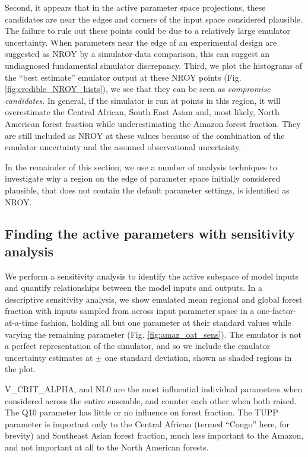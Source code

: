 \documentclass[esd, manuscript]{copernicus}
\begin{document}
Second, it appears that in the active parameter space projections, these candidates are near the edges and corners of the input space considered plausible. The failure to rule out these points could be due to a relatively large emulator uncertainty. When parameters near the edge of an experimental design are suggested as NROY by a simulator-data comparison, this can suggest an undiagnosed fundamental simulator discrepancy. Third, we plot the histograms of the ``best estimate'' emulator output at these NROY points (Fig.  \ref{fig:credible_NROY_hists}), we see that they can be seen as \emph{compromise candidates}. In general, if the simulator is run at points in this region, it will overestimate the Central African, South East Asian and, most likely, North American forest fraction while underestimating the Amazon forest fraction. They are still included as NROY at these values because of the combination of the emulator uncertainty and the assumed observational uncertainty.


In the remainder of this section, we use a number of analysis techniques to investigate why a region on the edge of parameter space initially considered plausible, that does not contain the default parameter settings, is identified as NROY.

\subsection{Finding the active parameters with sensitivity analysis}\label{ssec:sensitivity}

We perform a sensitivity analysis to identify the active subspace of model inputs and quantify relationships between the model inputs and outputs. In a descriptive sensitivity analysis, we show emulated mean regional and global forest fraction with inputs sampled from across input parameter space in a one-factor-at-a-time fashion, holding all but one parameter at their standard values while varying the remaining parameter (Fig.  \ref{fig:amaz_oat_sens}). The emulator is not a perfect representation of the simulator, and so we include the emulator uncertainty estimates at $\pm$ one standard deviation, shown as shaded regions in the plot.

V\_CRIT\_ALPHA, and NL0 are the most influential individual parameters when considered across the entire ensemble, and counter each other when both raised. The Q10 parameter has little or no influence on forest fraction. The TUPP parameter is important only to the Central African (termed ``Congo'' here, for brevity) and Southeast Asian forest fraction, much less important to the Amazon, and not important at all to the North American forests. 
\end{document}
